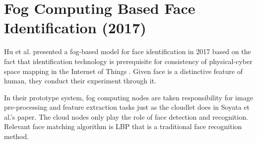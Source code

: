 \section{Fog Computing Based Face Identification (2017)}

Hu et al. presented a fog-based model for face identification in 2017 based on the fact that identification technology is prerequisite for consistency of physical-cyber space mapping in the Internet of Things \cite{hu2017fog}. Given face is a distinctive feature of human, they conduct their experiment through it. 

In their prototype system, fog computing nodes are taken responsibility for image pre-processing and feature extraction tasks just as the cloudlet does in Soyata et al.'s paper. The cloud nodes only play the role of face detection and recognition. Relevant face matching algorithm is LBP that is a traditional face recognition method.